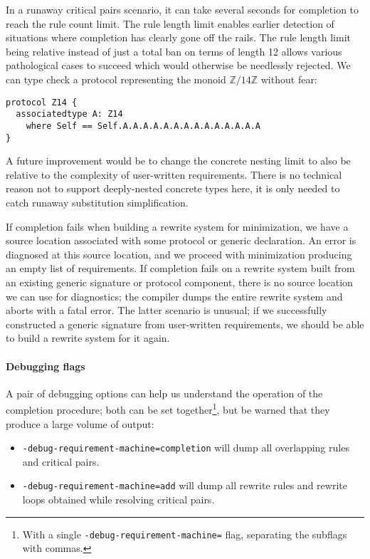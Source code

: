\documentclass[../generics]{subfiles}
\begin{document}
In a runaway critical pairs scenario, it can take several seconds for completion to reach the rule count limit. The rule length limit enables earlier detection of situations where completion has clearly gone off the rails. The rule length limit being relative instead of just a total ban on terms of length 12 allows various pathological cases to succeed which would otherwise be needlessly rejected. We can type check a protocol representing the monoid $\mathbb{Z}/14\mathbb{Z}$ without fear:
\begin{Verbatim}
protocol Z14 {
  associatedtype A: Z14
    where Self == Self.A.A.A.A.A.A.A.A.A.A.A.A.A.A
}
\end{Verbatim}

A future improvement would be to change the concrete nesting limit to also be relative to the complexity of user-written requirements. There is no technical reason not to support deeply-nested concrete types here, it is only needed to catch runaway substitution simplification.

If completion fails when building a rewrite system for minimization, we have a source location associated with some protocol or generic declaration. An error is diagnosed at this source location, and we proceed with minimization producing an empty list of requirements. If completion fails on a rewrite system built from an existing generic signature or protocol component, there is no source location we can use for diagnostics; the compiler dumps the entire rewrite system and aborts with a fatal error. The latter scenario is unusual; if we successfully constructed a generic signature from user-written requirements, we should be able to build a rewrite system for it again.

\paragraph{Debugging flags}
A pair of debugging options can help us understand the operation of the completion procedure; both can be set together\footnote{With a single \texttt{-debug-requirement-machine=} flag, separating the subflags with commas.}, but be warned that they produce a large volume of output:
\begin{itemize}
\item {} \texttt{-debug-requirement-machine=completion} will dump all overlapping rules and critical pairs.
\item {} \texttt{-debug-requirement-machine=add} will dump all rewrite rules and rewrite loops obtained while resolving critical pairs.
\end{itemize}
\end{document}
